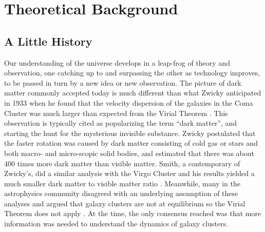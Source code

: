 \chapter{Theoretical Background }\label{theory} %


\section{A Little History}
Our understanding of the universe develops in a leap-frog of theory and observation, one catching up to and surpassing the other as technology improves, to be passed in turn by a new idea or new observation. The picture of dark matter commonly accepted today is much different than what Zwicky anticipated in 1933 when he found that the velocity dispersion of the galaxies in the Coma Cluster was much larger than expected from the Virial Theorem \cite{Zwicky1933}. This observation is typically cited as popularizing the term ``dark matter'', and starting the hunt for the mysterious invisible substance. Zwicky postulated that the faster rotation was caused by dark matter consisting of cold gas or stars and both macro- and micro-scopic solid bodies, and estimated that there was about 400 times more dark matter than visible matter. Smith, a contemporary of Zwicky's, did a similar analysis with the Virgo Cluster and his results yielded a much smaller dark matter to visible matter ratio \cite{Bertone2016}. Meanwhile, many in the astrophysics community disagreed with an underlying assumption of these analyses and argued that galaxy clusters are not at equilibrium so the Virial Theorem does not apply \cite{Bertone2016}. At the time, the only consensus reached was that more information was needed to understand the dynamics of galaxy clusters. 

